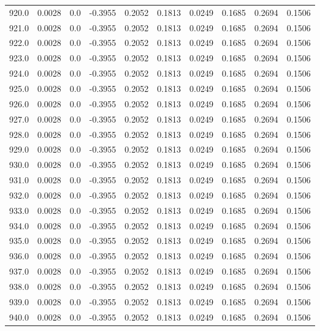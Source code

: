 \begin{longtable}{lrrrrrrrrr}
920.0 & 0.0028 & 0.0 & -0.3955 & 0.2052 & 0.1813 & 0.0249 & 0.1685 & 0.2694 & 0.1506 \\
921.0 & 0.0028 & 0.0 & -0.3955 & 0.2052 & 0.1813 & 0.0249 & 0.1685 & 0.2694 & 0.1506 \\
922.0 & 0.0028 & 0.0 & -0.3955 & 0.2052 & 0.1813 & 0.0249 & 0.1685 & 0.2694 & 0.1506 \\
923.0 & 0.0028 & 0.0 & -0.3955 & 0.2052 & 0.1813 & 0.0249 & 0.1685 & 0.2694 & 0.1506 \\
924.0 & 0.0028 & 0.0 & -0.3955 & 0.2052 & 0.1813 & 0.0249 & 0.1685 & 0.2694 & 0.1506 \\
925.0 & 0.0028 & 0.0 & -0.3955 & 0.2052 & 0.1813 & 0.0249 & 0.1685 & 0.2694 & 0.1506 \\
926.0 & 0.0028 & 0.0 & -0.3955 & 0.2052 & 0.1813 & 0.0249 & 0.1685 & 0.2694 & 0.1506 \\
927.0 & 0.0028 & 0.0 & -0.3955 & 0.2052 & 0.1813 & 0.0249 & 0.1685 & 0.2694 & 0.1506 \\
928.0 & 0.0028 & 0.0 & -0.3955 & 0.2052 & 0.1813 & 0.0249 & 0.1685 & 0.2694 & 0.1506 \\
929.0 & 0.0028 & 0.0 & -0.3955 & 0.2052 & 0.1813 & 0.0249 & 0.1685 & 0.2694 & 0.1506 \\
930.0 & 0.0028 & 0.0 & -0.3955 & 0.2052 & 0.1813 & 0.0249 & 0.1685 & 0.2694 & 0.1506 \\
931.0 & 0.0028 & 0.0 & -0.3955 & 0.2052 & 0.1813 & 0.0249 & 0.1685 & 0.2694 & 0.1506 \\
932.0 & 0.0028 & 0.0 & -0.3955 & 0.2052 & 0.1813 & 0.0249 & 0.1685 & 0.2694 & 0.1506 \\
933.0 & 0.0028 & 0.0 & -0.3955 & 0.2052 & 0.1813 & 0.0249 & 0.1685 & 0.2694 & 0.1506 \\
934.0 & 0.0028 & 0.0 & -0.3955 & 0.2052 & 0.1813 & 0.0249 & 0.1685 & 0.2694 & 0.1506 \\
935.0 & 0.0028 & 0.0 & -0.3955 & 0.2052 & 0.1813 & 0.0249 & 0.1685 & 0.2694 & 0.1506 \\
936.0 & 0.0028 & 0.0 & -0.3955 & 0.2052 & 0.1813 & 0.0249 & 0.1685 & 0.2694 & 0.1506 \\
937.0 & 0.0028 & 0.0 & -0.3955 & 0.2052 & 0.1813 & 0.0249 & 0.1685 & 0.2694 & 0.1506 \\
938.0 & 0.0028 & 0.0 & -0.3955 & 0.2052 & 0.1813 & 0.0249 & 0.1685 & 0.2694 & 0.1506 \\
939.0 & 0.0028 & 0.0 & -0.3955 & 0.2052 & 0.1813 & 0.0249 & 0.1685 & 0.2694 & 0.1506 \\
940.0 & 0.0028 & 0.0 & -0.3955 & 0.2052 & 0.1813 & 0.0249 & 0.1685 & 0.2694 & 0.1506 \\

\end{longtable}
